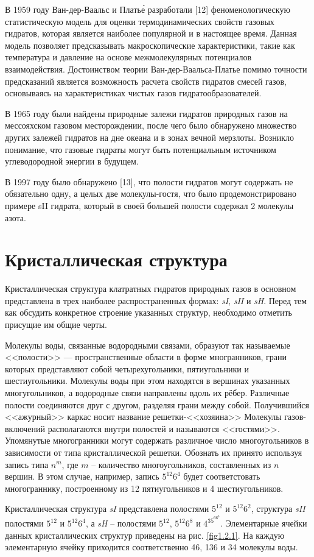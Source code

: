 \par В 1959 году Ван-дер-Ваальс и Плать\'е разработали [12]  феноменологическую статистическую модель для оценки термодинамических свойств газовых гидратов, которая является наиболее популярной и в настоящее время. Данная модель позволяет предсказывать макроскопические характеристики, такие как температура и давление на основе межмолекулярных потенциалов взаимодействия. Достоинством теории Ван-дер-Ваальса-Платье помимо точности предсказаний является возможность расчета свойств гидратов смесей газов, основываясь на характеристиках чистых газов гидратообразователей.


\par В 1965 году были найдены природные залежи гидратов природных газов на мессояхском газовом месторождении, после чего было обнаружено множество других залежей гидратов на дне океана и в зонах вечной мерзлоты. Возникло понимание, что газовые гидраты могут быть потенциальным источником углеводородной энергии в будущем.
    
\par В 1997 году было обнаружено [13], что полости гидратов могут содержать не обязательно одну, а целых две молекулы-гостя, что было продемонстрировано примере sII гидрата, который в своей большей полости содержал 2 молекулы азота.

\section{Кристаллическая структура}

\par Кристаллическая структура клатратных гидратов природных газов в основном представлена в трех наиболее распространенных формах: \textit{sI}, \textit{sII} и \textit{sH}. Перед тем как обсудить конкретное строение указанных структур, необходимо отметить присущие им общие черты.
\par Молекулы воды, связанные водородными связами, образуют так называемые <<полости>> --- пространственные области в форме многранников, грани которых представляют собой четырехугольники, пятиугольники и шестиугольники. Молекулы воды при этом находятся в вершинах указанных многугольников, а водородные связи направлены вдоль их рёбер. Различные полости соединяются друг с другом, разделяя грани между собой. Получившийся <<ажурный>> каркас носит название решетки-<<хозяина>> Молекулы газов-включений располагаются внутри полостей и называются <<гостями>>. Упомянутые многогранники могут содержать различное число многоугольников в зависимости от типа кристаллической решетки. Обознать их принято используя запись типа $n^m$, где $m$ -- количество многоугольников, составленных из $n$ вершин. В этом случае, например, запись $5^{12}6^4$ будет соответстовать многограннику, построенному из 12 пятиугольников и 4 шестиугольников.
\par Кристаллическая структура \textit{sI} представлена полостями $5^{12}$ и $5^{12}6^2$, структура \textit{sII} полостями $5^12$ и $5^{12}6^4$, а \textit{sH} -- полостями $5^{12}$, $5^{12}6^8$ и $4^35^66^3$. Элементарные ячейки данных кристаллических структур приведены на рис. \ref{fig1.2.1}. На каждую элементарную ячейку приходится соответственно 46, 136 и 34 молекулы воды.

